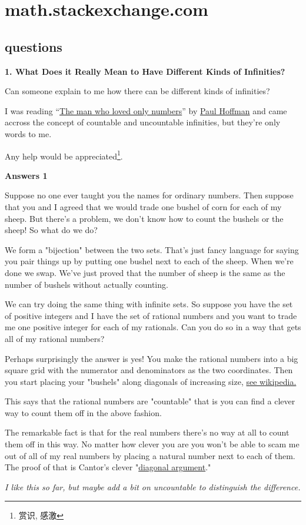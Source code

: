 \chapter{math.stackexchange.com}
\section{questions}
\bf 1. What Does it Really Mean to Have Different Kinds of Infinities?

\rm Can someone explain to me how there can be different kinds of infinities?

I was reading ``\href{http://en.wikipedia.org/wiki/The_Man_Who_Loved_Only_Numbers}{The man who loved only numbers}'' 
by \href{http://en.wikipedia.org/wiki/Paul_Hoffman_(science_writer)}{Paul Hoffman} and came accross the concept of countable
and uncountable infinities, but they're only words to me.

Any help would be appreciated\footnote{赏识, 感激}.

\bf Answers 1

\rm Suppose no one ever taught you the names for ordinary numbers. Then suppose that you and I 
agreed that we would trade one bushel of corn for each of my sheep. 
But there's a problem, we don't know how to count the bushels or the sheep! 
So what do we do?

We form a "bijection" between the two sets. That's just fancy language for saying 
you pair things up by putting one bushel next to each of the sheep. When we're 
done we swap. We've just proved that the number of sheep is the same as 
the number of bushels without actually counting.

We can try doing the same thing with infinite sets. So suppose you have the set 
of positive integers and I have the set of 
rational numbers and you want to trade me one positive integer for each of my rationals. 
Can you do so in a way that gets all of my rational numbers?

Perhaps surprisingly the answer is yes! You make the rational numbers into a big square 
grid with the numerator and denominators as the two coordinates. 
Then you start placing your "bushels" along diagonals of increasing size, 
\href{http://en.wikipedia.org/wiki/File:Pairing_natural.svg}{see wikipedia.}

This says that the rational numbers are "countable" that is you can 
find a clever way to count them off in the above fashion.

The remarkable fact is that for the real numbers there's no way at all to count them off in this way. 
No matter how clever you are you won't be able to scam me out of all of my real numbers by placing 
a natural number next to each of them. The proof of that is Cantor's 
clever "\href{http://en.wikipedia.org/wiki/Cantor's_diagonal_argument}{diagonal argument}."

\it I like this so far, but maybe add a bit on uncountable to distinguish the difference.